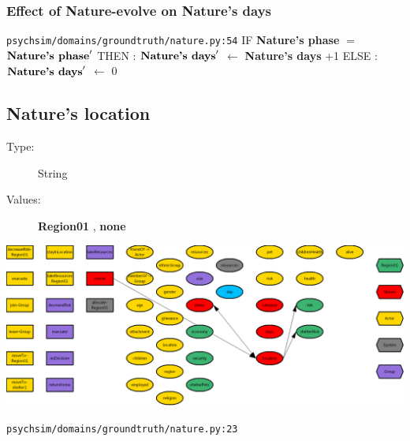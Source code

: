 \documentclass{article}%
\begin{document}
\subsubsection{Effect of Nature{-}evolve on Nature's days}%
\label{ssubsec:Effect of Nature{-}evolve on Nature's days}%
\begin{flushleft}%
\verb|psychsim/domains/groundtruth/nature.py:54|%
\linebreak%
IF %
\textbf{Nature's phase}%
$=$%
$\mbox{\textbf{Nature's phase}} '$%
\linebreak%
\hspace*{2em}%
THEN %
: %
$\mbox{\textbf{Nature's days}} '$%
$\leftarrow$%
\textbf{Nature's days}%
+1%
\linebreak%
\hspace*{2em}%
ELSE %
: %
$\mbox{\textbf{Nature's days}} '$%
$\leftarrow$%
0%
\end{flushleft}

%
\subsection{Nature's location}%
\label{subsec:Nature's location}%
\begin{description}%
\item[Type:]%
String%
\item[Values:]%
\textbf{Region01}%
, %
\textbf{none}%
\end{description}%
\includegraphics[width=\textwidth]{images/locationOfNature.png}%
\begin{flushleft}%
\verb|psychsim/domains/groundtruth/nature.py:23|%
\end{flushleft}%
\end{document}
